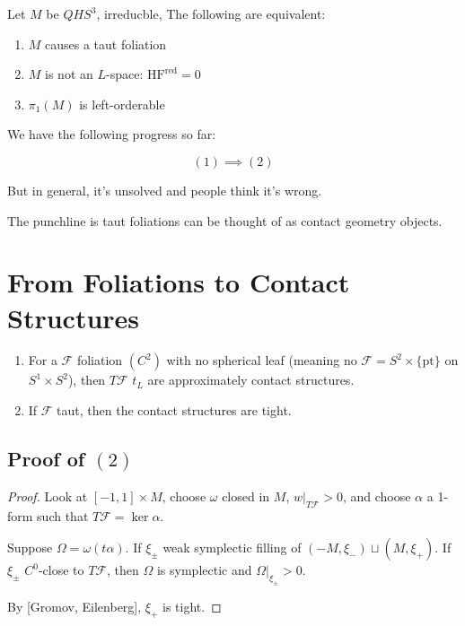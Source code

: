 \begin{conjecture}

Let $M$ be $QHS^3$, irreducble, The following are equivalent:
\begin{enumerate}
\item $M$ causes a taut foliation
\item $M$ is not an $L$-space: $\text{HF}^{\text{red}}=0$
\item $\pi_1(M)$ is left-orderable
\end{enumerate}

\end{conjecture}

We have the following progress so far:

\begin{theorem}
\[
(1)\implies (2)
\]
\end{theorem}

But in general, it's unsolved and people think it's wrong.

The punchline is taut foliations can be thought of as contact geometry objects.

\section{From Foliations to Contact Structures}

\begin{theorem}

\begin{enumerate}
\item For a $\mathcal{F}$ foliation $(C^2)$ with no spherical leaf (meaning no $\mathcal{F}=S^2 \times \{\text{pt}\}$ on $S^1\times S^2$), then $T\mathcal{F}$ $t_L$ are approximately contact structures.
\item If $\mathcal{F}$ taut, then the contact structures are tight.
\end{enumerate}

\end{theorem}

\subsection{Proof of $(2)$}

\begin{proof}
Look at $[-1, 1]\times M$, choose $\omega$ closed in $M$, $w|_{T\mathcal{F}}>0$, and choose $\alpha$ a 1-form such that $T\mathcal{F}=\ker \alpha$.

Suppose $\Omega = \omega(t\alpha)$. If $\xi_{\pm}$ weak symplectic filling of $(-M, \xi_-) \sqcup (M, \xi_+)$. If $\xi_\pm$ $C^0$-close to $T\mathcal{F}$, then $\Omega$ is symplectic and $\Omega|_{\xi_\pm}>0$.

By [Gromov, Eilenberg], $\xi_+$ is tight.
\end{proof}

